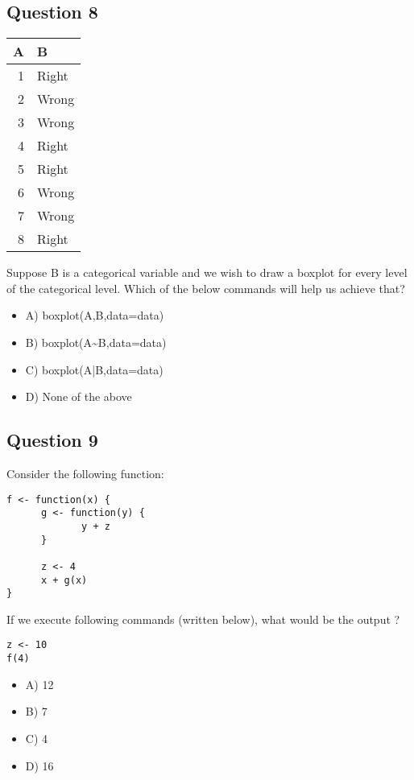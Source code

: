\documentclass[11pt]{article}
\begin{document}
\subsection*{Question 8}
\label{sec:orgc3d6875}

\begin{center}
\begin{tabular}{rl}
A & B\\
\hline
1 & Right\\
2 & Wrong\\
3 & Wrong\\
4 & Right\\
5 & Right\\
6 & Wrong\\
7 & Wrong\\
8 & Right\\
\end{tabular}
\end{center}

Suppose B is a categorical variable and we wish to draw a boxplot for every
level of the categorical level. Which of the below commands will help us achieve
that?

\begin{itemize}
\item A) boxplot(A,B,data=data)

\item B) boxplot(A\textasciitilde{}B,data=data)

\item C) boxplot(A|B,data=data)

\item D) None of the above
\end{itemize}

\subsection*{Question 9}
\label{sec:org2da4805}
Consider the following function:
\begin{verbatim}
f <- function(x) {
      g <- function(y) {
             y + z
      }

      z <- 4
      x + g(x)
}
\end{verbatim}

If we execute following commands (written below), what would be the output ?

\begin{verbatim}
z <- 10
f(4)
\end{verbatim}

\begin{itemize}
\item A) 12

\item B) 7

\item C) 4

\item D) 16
\end{itemize}
\end{document}
